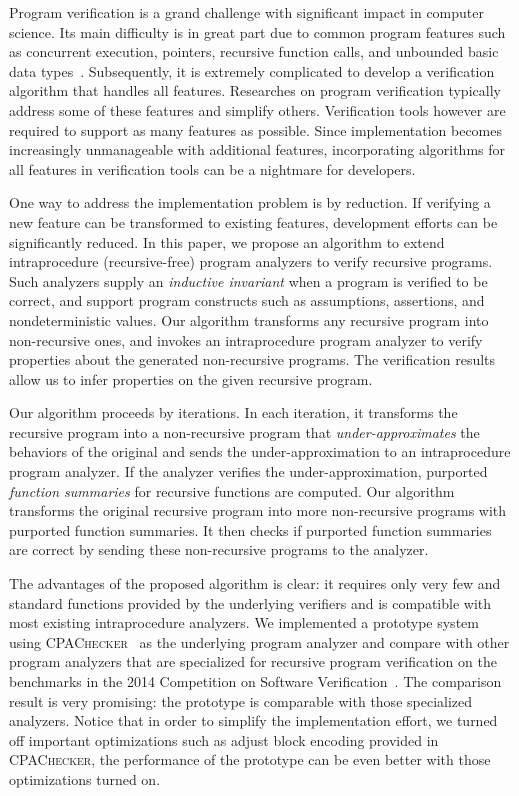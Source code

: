 Program verification is a grand challenge with significant impact in computer science.
Its main difficulty is in great part due to common program features such as concurrent execution,  pointers,  recursive function calls,  and unbounded basic data types~\cite{ClarkeJS05}. Subsequently, it is extremely complicated to develop a verification algorithm that handles all features. Researches on program verification typically address some of these features and simplify others. Verification tools however are required to support as many features as possible. Since implementation becomes increasingly unmanageable with additional features, incorporating algorithms for all features in verification tools can be a nightmare for developers.

One way to address the implementation problem is by reduction. If verifying a new feature can be transformed to existing features, development efforts can be significantly reduced.
In this paper, we propose an algorithm to extend intraprocedure (recursive-free) program analyzers to verify recursive programs. Such analyzers supply an \emph{inductive invariant} when a program is verified to be correct, and support program constructs such as assumptions, assertions, and nondeterministic values. Our algorithm transforms any recursive program into non-recursive ones, and invokes an intraprocedure program analyzer to verify properties about the generated non-recursive programs. The verification results allow us to infer properties on the given recursive program.

Our algorithm proceeds by iterations. In each iteration, it transforms the recursive program into a non-recursive program that \emph{under-approximates} the behaviors of the original and sends the under-approximation to an intraprocedure program analyzer. If the analyzer verifies the under-approximation, purported \emph{function summaries} for recursive functions are computed. Our algorithm transforms the original recursive program into more non-recursive programs with purported function summaries. It then checks if purported function summaries are correct by sending these non-recursive programs to the analyzer.

The advantages of the proposed algorithm is clear: it requires only very few and standard functions provided by the underlying verifiers and is compatible with most existing intraprocedure analyzers. We implemented a prototype system using \textsc{CPAChecker}~\cite{BeyerK11} as the underlying program analyzer and compare
with other program analyzers that are specialized for recursive program verification on the benchmarks in the 2014 Competition on Software Verification~\cite{svcomp14}.
The comparison result is very promising: the prototype is comparable with those specialized analyzers. Notice that in order to simplify the implementation effort, we turned off important optimizations such as adjust block encoding provided in \textsc{CPAChecker}, the performance of the prototype can be even better with those optimizations turned on. 

